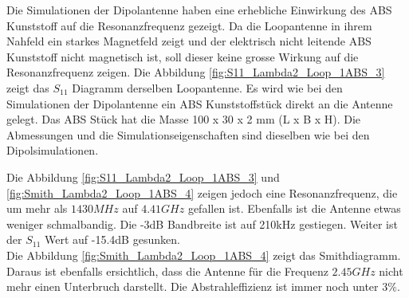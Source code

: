 Die Simulationen der Dipolantenne haben eine erhebliche Einwirkung des ABS Kunststoff auf die Resonanzfrequenz gezeigt. Da die Loopantenne in ihrem Nahfeld ein starkes Magnetfeld zeigt und der elektrisch nicht leitende ABS Kunststoff  nicht magnetisch ist, soll dieser keine grosse Wirkung auf die Resonanzfrequenz zeigen. 
Die Abbildung \ref{fig:S11_Lambda2_Loop_1ABS_3} zeigt das $S_{11}$ Diagramm derselben Loopantenne. Es wird wie bei den Simulationen der Dipolantenne ein ABS Kunststoffstück direkt an die Antenne gelegt. Das ABS Stück hat die Masse 100 x 30 x 2 mm (L x B x H). Die Abmessungen und die Simulationseigenschaften sind dieselben wie bei den Dipolsimulationen.

Die Abbildung \ref{fig:S11_Lambda2_Loop_1ABS_3} und \ref{fig:Smith_Lambda2_Loop_1ABS_4} zeigen jedoch eine Resonanzfrequenz, die um mehr als $1430MHz$ auf $4.41GHz$ gefallen ist. Ebenfalls ist die Antenne etwas weniger schmalbandig. Die -3dB Bandbreite ist auf 210kHz gestiegen. Weiter ist der $S_{11}$ Wert auf -15.4dB gesunken.\\Die Abbildung \ref{fig:Smith_Lambda2_Loop_1ABS_4} zeigt das Smithdiagramm. Daraus ist ebenfalls ersichtlich, dass die Antenne für die Frequenz $2.45GHz$ nicht mehr einen Unterbruch darstellt. Die Abstrahleffizienz ist immer noch unter $3\%$.


